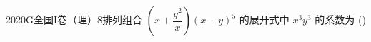 
\begin{problem}{2020}{G}{全国I卷（理）}{8}{排列组合}
$ \left(x + \dfrac{y^2}{x}\right)(x + y)^5 $ 的展开式中 $ x^3 y^3 $ 的系数为 (\hspace{1cm})
\begin{choices}
\end{choices}
\end{problem}

\begin{answer}

\end{answer}

\begin{solutions}

\end{solutions}